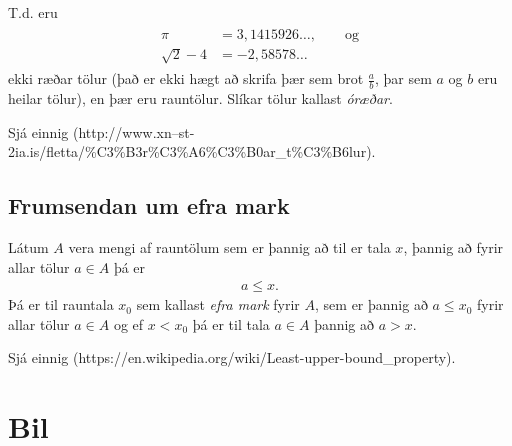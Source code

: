 \documentclass[a4paper,10pt,icelandic]{sphinxmanual}
\begin{document}
T.d. eru
\begin{equation*}
\begin{split}\begin{aligned}
\pi &= 3,1415926\ldots, \qquad \text{og}\\
\sqrt 2 -4  &= -2,58578\ldots\end{aligned}\end{split}
\end{equation*}
ekki ræðar tölur (það er ekki hægt að skrifa þær sem brot
\(\frac ab\), þar sem \(a\) og \(b\) eru heilar tölur), en
þær eru rauntölur. Slíkar tölur kallast \textit{óræðar}.

Sjá einnig  (http://www.xn--st-2ia.is/fletta/\%C3\%B3r\%C3\%A6\%C3\%B0ar\_t\%C3\%B6lur).


\subsection{Frumsendan um efra mark}
\label{\detokenize{kafli01:frumsendanumeframark}}\label{\detokenize{kafli01:index-1}}\label{\detokenize{kafli01:frumsendan-um-efra-mark}}
Látum \(A\) vera mengi af rauntölum sem
er þannig að til er tala \(x\), þannig að fyrir allar tölur
\(a \in A\) þá er
\begin{equation*}
\begin{split}a\leq x.\end{split}
\end{equation*}
Þá er til rauntala \(x_0\) sem kallast \textit{efra mark} fyrir
\(A\), sem er þannig að \(a\leq x_0\) fyrir allar tölur
\(a\in
A\) og ef \(x<x_0\) þá er til tala \(a\in A\) þannig að
\(a>x\).

Sjá einnig  (https://en.wikipedia.org/wiki/Least-upper-bound\_property).


\section{Bil}
\label{\detokenize{kafli01:bil}}\label{\detokenize{kafli01:skilgreining-1-3-1}}
\end{document}
